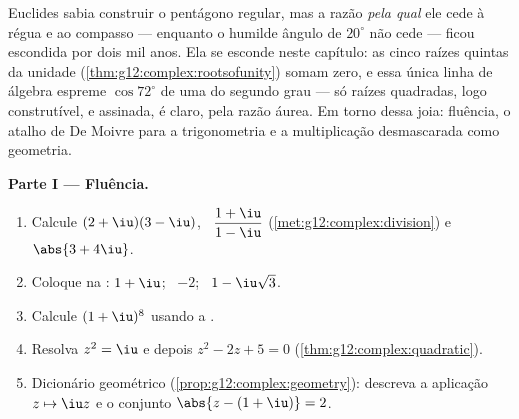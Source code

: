 \begin{problem}
\label{pb:g12:complex:1}
Euclides sabia construir o pentágono regular, mas a razão
\emph{pela qual} ele cede à régua e ao compasso --- enquanto o
humilde ângulo de $20^\circ$ não cede --- ficou escondida por dois
mil anos. Ela se esconde neste capítulo: as cinco raízes quintas
da unidade (\cref{thm:g12:complex:rootsofunity}) somam zero, e essa
única linha de álgebra espreme $\cos 72^\circ$ de uma  do
segundo grau --- só raízes quadradas, logo construtível, e
assinada, é claro, pela razão áurea. Em torno dessa joia:
fluência, o atalho de De Moivre para a trigonometria e a
multiplicação desmascarada como geometria.

\medskip
\noindent\textbf{Parte I --- Fluência.}
\begin{enumerate}
  \item Calcule $(2 + \iu)(3 - \iu)$, \
        $\dfrac{1 + \iu}{1 - \iu}$
        (\cref{met:g12:complex:division}) e $\abs{3 + 4\iu}$.
  \item Coloque na : $1 + \iu$; \ $-2$; \
        $1 - \iu\sqrt3$.
  \item Calcule $(1 + \iu)^8$ usando a \omterm{def:g12:complex:argument}{forma exponencial}.
  \item Resolva $z^2 = \iu$ e depois $z^2 - 2z + 5 = 0$
        (\cref{thm:g12:complex:quadratic}).
  \item Dicionário geométrico
        (\cref{prop:g12:complex:geometry}): descreva a aplicação
        $z \mapsto \iu z$ e o conjunto
        $\abs{z - (1 + \iu)} = 2$.
\end{enumerate}


\end{problem}
